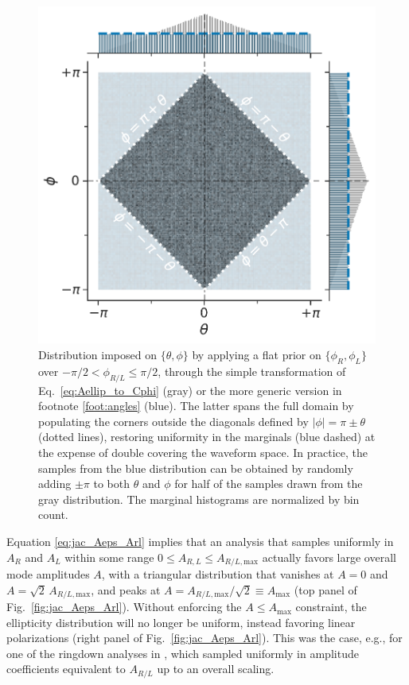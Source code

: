 \documentclass[aps,prd,twocolumn,superscriptaddress,preprintnumbers,floatfix,nofootinbib]{revtex4-2}
\newcommand*{\eq}[1]{Eq.~\eqref{eq:#1}}
\begin{document}
\begin{figure}
\includegraphics[width=0.8\columnwidth]{jac_Aeps_Arl_angles}
\caption{Distribution imposed on $\{\theta,\phi\}$ by applying a flat prior on $\{\phi_R,\phi_L\}$ over $-\pi/2 < \phi_{R/L} \leq \pi/2$, through the simple transformation of \eq{Aellip_to_Cphi} (gray) or the more generic version in footnote \ref{foot:angles} (blue).
The latter spans the full domain by populating the corners outside the diagonals defined by $|\phi| = \pi \pm \theta$ (dotted lines), restoring uniformity in the marginals (blue dashed) at the expense of double covering the waveform space.
In practice, the samples from the blue distribution can be obtained by randomly adding $\pm \pi$ to both $\theta$ and $\phi$ for  half of the samples drawn from the gray distribution.
The marginal histograms are normalized by bin count.
}
\label{fig:jac_Aeps_Arl_angles}
\end{figure}

Equation \eqref{eq:jac_Aeps_Arl} implies that an analysis that samples uniformly in $A_R$ and $A_L$ within some range $0 \leq A_{R,L} \leq A_{R/L,\mathrm{max}}$ actually favors large overall mode amplitudes $A$, with a triangular distribution that vanishes at $A=0$ and $A=\sqrt{2}\,A_{R/L,\mathrm{max}}$, and peaks at $A = A_{R/L,\mathrm{max}}/\sqrt{2} \equiv A_{\max}$ (top panel of Fig.~\ref{fig:jac_Aeps_Arl}).
Without enforcing the $A \leq A_{\max}$ constraint, the ellipticity distribution will no longer be uniform, instead favoring linear polarizations (right panel of Fig.~\ref{fig:jac_Aeps_Arl}).
This was the case, e.g., for one of the ringdown analyses in \cite{LIGOScientific:2020tif}, which sampled uniformly in amplitude coefficients equivalent to $A_{R/L}$ up to an overall scaling.
\end{document}
